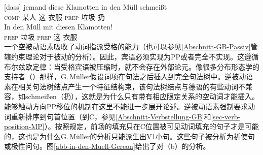 \begin{exe}
\begin{xlist}[iv.]
\begin{exe}
\begin{xlist}[iv.]
\eal
\ex 
\gll {}[dass] jemand diese Klamotten in den Müll schmeißt\\
     {}\spacebr{}\textsc{comp} 某人 这 衣服 \textsc{prep}  垃圾 扔\\
\ex\label{in-den-Muell-mit} 
\gll In den Müll mit diesen Klamotten!\\
     \textsc{prep}  垃圾 \textsc{prep} 这 衣服\\
\zl
一个空被动语素吸收了动词指派受格的能力（也可以参见\ref{Abschnitt-GB-Passiv}管辖约束理论对于被动的分析）。因此，宾语必须实现为PP或者完全不实现。这遵循布尔兹欧定律：当受格宾语被压缩时，就不会存在外部论元。像很多分布形态学的支持者（\egc \citet{Marantz97a}）那样，G.\,Müller假设词项在句法之后插入到完全句法树中。逆被动语素在相关句法树结点产生一个特征结构束，该句法树结点与德语的有些动词不兼容，如schmeißen（扔），这就是为什么只有带有相应限定关系的空动词才能插入。能够触动方向PP移位的机制在这里不能进一步展开论述。逆被动语素强制要求动词重新排序到句首位置（到C，参见\ref{Abschnitt-Verbstellung-GB}和\ref{sec-verb-position-MP}）。按照规定，前场的填充只在C位置被可见动词填充的句子才是可能的，这也是为什么G.\,Müller的分析只能派生出V1小句。这些句子被分析为祈使句或极性问句。图\vref{abb-in-den-Muell-Gereon}给出了对（b）的分析。

\end{xlist}
\end{exe}
\end{xlist}
\end{exe}
